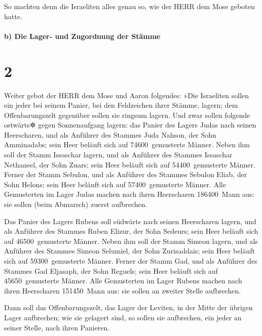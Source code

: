So machten denn die Israeliten alles genau so, wie der
HERR dem Mose geboten hatte.

\hypertarget{b-die-lager--und-zugordnung-der-stuxe4mme}{%
\paragraph{b) Die Lager- und Zugordnung der
Stämme}\label{b-die-lager--und-zugordnung-der-stuxe4mme}}

\hypertarget{section-1}{%
\section{2}\label{section-1}}

Weiter gebot der HERR dem Mose und Aaron folgendes:
»Die Israeliten sollen ein jeder bei seinem Panier, bei
den Feldzeichen ihrer Stämme, lagern; dem Offenbarungszelt gegenüber
sollen sie ringsum lagern. Und zwar sollen folgende
ostwärts✲ gegen Sonnenaufgang lagern: das Panier des Lagers Judas nach
seinen Heerscharen, und als Anführer des Stammes Juda Nahson, der Sohn
Amminadabs; sein Heer beläuft sich auf 74600~gemusterte
Männer. Neben ihm soll der Stamm Issaschar lagern, und als
Anführer des Stammes Issaschar Nethaneel, der Sohn Zuars;
sein Heer beläuft sich auf 54400~gemusterte Männer.
Ferner der Stamm Sebulon, und als Anführer des Stammes
Sebulon Eliab, der Sohn Helons; sein Heer beläuft sich auf
57400~gemusterte Männer. Alle Gemusterten im Lager Judas
machen nach ihren Heerscharen 186400~Mann aus: sie sollen (beim
Abmarsch) zuerst aufbrechen.

Das Panier des Lagers Rubens soll südwärts nach seinen
Heerscharen lagern, und als Anführer des Stammes Ruben Elizur, der Sohn
Sedeurs; sein Heer beläuft sich auf 46500~gemusterte
Männer. Neben ihm soll der Stamm Simeon lagern, und als
Anführer des Stammes Simeon Selumiel, der Sohn Zurisaddais;
sein Heer beläuft sich auf 59300~gemusterte Männer.
Ferner der Stamm Gad, und als Anführer des Stammes Gad
Eljasaph, der Sohn Reguels; sein Heer beläuft sich auf
45650~gemusterte Männer. Alle Gemusterten im Lager Rubens
machen nach ihren Heerscharen 151450~Mann aus: sie sollen an zweiter
Stelle aufbrechen.

Dann soll das Offenbarungszelt, das Lager der Leviten, in
der Mitte der übrigen Lager aufbrechen; wie sie gelagert sind, so sollen
sie aufbrechen, ein jeder an seiner Stelle, nach ihren Panieren.

